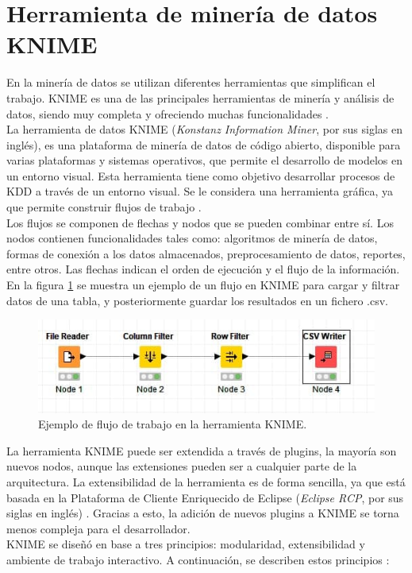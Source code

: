 \section{Herramienta de minería de datos KNIME}

En la minería de datos se utilizan diferentes herramientas que simplifican el trabajo. KNIME es una de las principales herramientas de minería y análisis de datos, siendo muy completa y ofreciendo muchas funcionalidades \citep{Lisandra2012}. \\
La herramienta de datos KNIME (\textit{Konstanz Information Miner}, por sus siglas en inglés), es una plataforma de minería de datos de código abierto, disponible para varias plataformas y sistemas operativos, que permite el desarrollo de modelos en un entorno visual. Esta herramienta tiene como objetivo desarrollar procesos de KDD a través de un entorno visual. Se le considera una herramienta gráfica, ya que permite construir flujos de trabajo \citep{KNIME2023}. \\
Los flujos se componen de flechas y nodos que se pueden combinar entre sí. Los nodos contienen funcionalidades tales como: algoritmos de minería de datos, formas de conexión a los datos almacenados, preprocesamiento de datos, reportes, entre otros. Las flechas indican el orden de ejecución y el flujo de la información. En la figura \ref{fig:ejemploworkflow} se muestra un ejemplo de un flujo en KNIME para cargar y filtrar datos de una tabla, y posteriormente guardar los resultados en un fichero .csv. 
\begin{figure}[H]
	\centering
	\includegraphics[width=0.9\linewidth]{figuras/ejemplo_workflow}
	\caption{Ejemplo de flujo de trabajo en la herramienta KNIME.}
	\label{fig:ejemploworkflow}
\end{figure}

La herramienta KNIME puede ser extendida a través de plugins, la mayoría son nuevos nodos, aunque las extensiones pueden ser a cualquier parte de la arquitectura. La extensibilidad de la herramienta es de forma sencilla, ya que está basada en la Plataforma de Cliente Enriquecido de Eclipse (\textit{Eclipse RCP}, por sus siglas en inglés) \citep{berthold2009knime}. Gracias a esto, la adición de nuevos plugins a KNIME se torna menos compleja para el desarrollador. \\
KNIME se diseñó en base a tres principios: modularidad, extensibilidad y ambiente de trabajo interactivo. A continuación, se describen estos principios \citep{Lisandra2012}:

